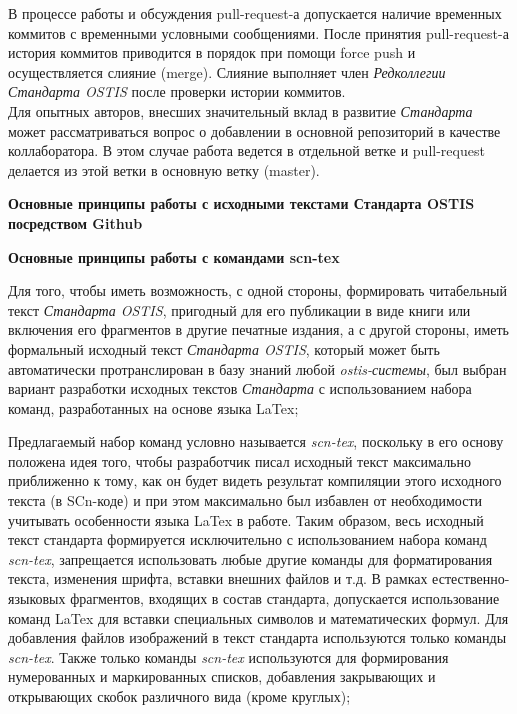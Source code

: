 \begin{SCn}
\begin{scnitemize}
\begin{scnitemizeii}
		В процессе работы и обсуждения pull-request-а  допускается наличие временных коммитов с временными условными сообщениями. После принятия pull-request-а история коммитов приводится в порядок при помощи force push и осуществляется слияние (merge). Слияние выполняет член \textit{Редколлегии Стандарта OSTIS} после проверки истории коммитов.\\
		
		Для опытных авторов, внесших значительный вклад в развитие \textit{Стандарта} может рассматриваться вопрос о добавлении в основной репозиторий в качестве коллаборатора. В этом случае работа ведется в отдельной ветке и pull-request делается из этой ветки в основную ветку (master).\\
	\end{scnitemizeii}
	\item \textbf{Основные принципы работы с исходными текстами Стандарта OSTIS посредством Github}
	\begin{scnitemizeii}
		\item \textbf{Основные принципы работы с командами scn-tex}
		\begin{scnitemizeiii}
			\item Для того, чтобы иметь возможность, с одной стороны, формировать читабельный текст \textit{Стандарта OSTIS}, пригодный для его публикации в виде книги или включения его фрагментов в другие печатные издания, а с другой стороны, иметь формальный исходный текст \textit{Стандарта OSTIS}, который может быть автоматически протранслирован в базу знаний любой \textit{ostis-системы}, был выбран вариант разработки исходных текстов \textit{Стандарта} с использованием набора команд, разработанных на основе языка LaTex;
			\item Предлагаемый набор команд условно называется \textit{scn-tex}, поскольку в его основу положена идея того, чтобы разработчик писал исходный текст максимально приближенно к тому, как он будет видеть результат компиляции этого исходного текста (в SCn-коде) и при этом максимально был избавлен от необходимости учитывать особенности языка LaTex в работе. Таким образом, весь исходный текст стандарта формируется исключительно с использованием набора команд \textit{scn-tex}, запрещается использовать любые другие команды для форматирования текста, изменения шрифта, вставки внешних файлов и т.д. В рамках естественно-языковых фрагментов, входящих в состав стандарта, допускается использование команд LaTex для вставки специальных символов и математических формул. Для добавления файлов изображений в текст стандарта используются только команды \textit{scn-tex}. Также только команды \textit{scn-tex} используются для формирования нумерованных и маркированных списков, добавления закрывающих и открывающих скобок различного вида (кроме круглых);

\end{scnitemizeiii}
\end{scnitemizeii}
\end{scnitemize}
\end{SCn}
